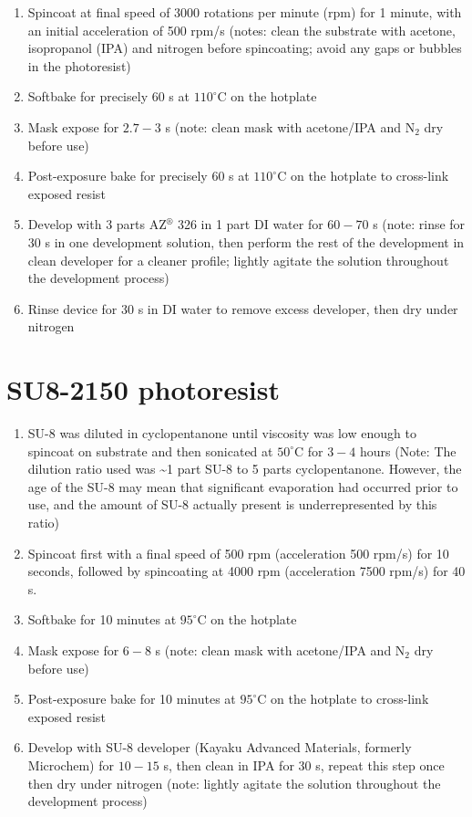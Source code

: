 \documentclass[
  a4paper,
]{scrbook}
\begin{document}
\begin{enumerate}
\def\labelenumi{\arabic{enumi}.}
\item
  Spincoat at final speed of 3000 rotations per minute (rpm) for 1
  minute, with an initial acceleration of 500 rpm/s (notes: clean the
  substrate with acetone, isopropanol (IPA) and nitrogen before
  spincoating; avoid any gaps or bubbles in the photoresist)
\item
  Softbake for precisely 60 s at \(110^\circ\)C on the hotplate
\item
  Mask expose for \(2.7-3\) s (note: clean mask with acetone/IPA and
  N\(_2\) dry before use)
\item
  Post-exposure bake for precisely 60 s at \(110^\circ\)C on the
  hotplate to cross-link exposed resist
\item
  Develop with 3 parts AZ\(^\circledR\) 326 in 1 part DI water for
  \(60-70\) s (note: rinse for 30 s in one development solution, then
  perform the rest of the development in clean developer for a cleaner
  profile; lightly agitate the solution throughout the development
  process)
\item
  Rinse device for 30 s in DI water to remove excess developer, then dry
  under nitrogen
\end{enumerate}

\hypertarget{su8-2150-photoresist}{%
\section{SU8-2150 photoresist}\label{su8-2150-photoresist}}

\begin{enumerate}
\def\labelenumi{\arabic{enumi}.}
\item
  SU-8 was diluted in cyclopentanone until viscosity was low enough to
  spincoat on substrate and then sonicated at \(50^\circ\)C for \(3-4\)
  hours (Note: The dilution ratio used was \textasciitilde1 part SU-8 to
  5 parts cyclopentanone. However, the age of the SU-8 may mean that
  significant evaporation had occurred prior to use, and the amount of
  SU-8 actually present is underrepresented by this ratio)
\item
  Spincoat first with a final speed of 500 rpm (acceleration 500 rpm/s)
  for 10 seconds, followed by spincoating at 4000 rpm (acceleration 7500
  rpm/s) for 40 s.
\item
  Softbake for 10 minutes at \(95^\circ\)C on the hotplate
\item
  Mask expose for \(6-8\) s (note: clean mask with acetone/IPA and
  N\(_2\) dry before use)
\item
  Post-exposure bake for 10 minutes at \(95^\circ\)C on the hotplate to
  cross-link exposed resist
\item
  Develop with SU-8 developer (Kayaku Advanced Materials, formerly
  Microchem) for \(10-15\) s, then clean in IPA for 30 s, repeat this
  step once then dry under nitrogen (note: lightly agitate the solution
  throughout the development process)
\end{enumerate}
\end{document}
